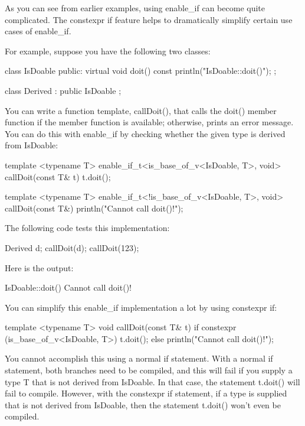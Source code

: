 
As you can see from earlier examples, using enable\_if can become quite complicated. The constexpr if feature helps to dramatically simplify certain use cases of enable\_if.

For example, suppose you have the following two classes:

\begin{cpp}
class IsDoable
{
    public:
        virtual void doit() const { println("IsDoable::doit()"); }
};

class Derived : public IsDoable { };
\end{cpp}

You can write a function template, callDoit(), that calls the doit() member function if the member function is available; otherwise, prints an error message. You can do this with enable\_if by checking whether the given type is derived from IsDoable:

\begin{cpp}
template <typename T>
enable_if_t<is_base_of_v<IsDoable, T>, void> callDoit(const T& t)
{
    t.doit();
}

template <typename T>
enable_if_t<!is_base_of_v<IsDoable, T>, void> callDoit(const T&)
{
    println("Cannot call doit()!");
}
\end{cpp}

The following code tests this implementation:

\begin{cpp}
Derived d;
callDoit(d);
callDoit(123);
\end{cpp}

Here is the output:

\begin{shell}
IsDoable::doit()
Cannot call doit()!
\end{shell}

You can simplify this enable\_if implementation a lot by using constexpr if:

\begin{cpp}
template <typename T>
void callDoit(const T& t)
{
    if constexpr (is_base_of_v<IsDoable, T>) {
        t.doit();
    } else {
        println("Cannot call doit()!");
    }
}
\end{cpp}

You cannot accomplish this using a normal if statement. With a normal if statement, both branches need to be compiled, and this will fail if you supply a type T that is not derived from IsDoable. In that case, the statement t.doit() will fail to compile. However, with the constexpr if statement, if a type is supplied that is not derived from IsDoable, then the statement t.doit() won’t even be compiled.

